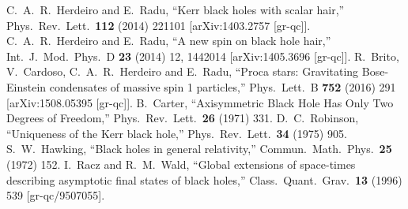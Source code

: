 \documentclass{article}
\numberwithin{equation}{section}
\begin{document}
\begin{small}
\begin{thebibliography}{99}

  C.~A.~R.~Herdeiro and E.~Radu,
  ``Kerr black holes with scalar hair,''
  Phys.\ Rev.\ Lett.\  {\bf 112} (2014) 221101
  [arXiv:1403.2757 [gr-qc]].
  C.~A.~R.~Herdeiro and E.~Radu,
  ``A new spin on black hole hair,''
  Int.\ J.\ Mod.\ Phys.\ D {\bf 23} (2014) 12,  1442014
  [arXiv:1405.3696 [gr-qc]].
  R.~Brito, V.~Cardoso, C.~A.~R.~Herdeiro and E.~Radu,
  ``Proca stars: Gravitating Bose-Einstein condensates of massive spin 1 particles,''
  Phys.\ Lett.\ B {\bf 752} (2016) 291
  [arXiv:1508.05395 [gr-qc]].
  B.~Carter,
  ``Axisymmetric Black Hole Has Only Two Degrees of Freedom,''
  Phys.\ Rev.\ Lett.\  {\bf 26} (1971) 331.
  D.~C.~Robinson,
  ``Uniqueness of the Kerr black hole,''
  Phys.\ Rev.\ Lett.\  {\bf 34} (1975) 905.
  S.~W.~Hawking,
  ``Black holes in general relativity,''
  Commun.\ Math.\ Phys.\  {\bf 25} (1972) 152.
  I.~Racz and R.~M.~Wald,
  ``Global extensions of space-times describing asymptotic final states of black holes,''
  Class.\ Quant.\ Grav.\  {\bf 13} (1996) 539
  [gr-qc/9507055].


\end{thebibliography}
\end{small}
\end{document}

